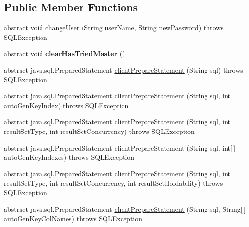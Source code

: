 \subsection*{Public Member Functions}
\begin{DoxyCompactItemize}
\item 
abstract void \mbox{\hyperlink{interfacecom_1_1mysql_1_1jdbc_1_1_connection_a6a6160ecb2c19b5f246450ba9252907d}{change\+User}} (String user\+Name, String new\+Password)  throws S\+Q\+L\+Exception
\item 
\mbox{\label{interfacecom_1_1mysql_1_1jdbc_1_1_connection_aa17ce88810bbbbfaa9b012f4762e7a1b}} 
abstract void {\bfseries clear\+Has\+Tried\+Master} ()
\item 
abstract java.\+sql.\+Prepared\+Statement \mbox{\hyperlink{interfacecom_1_1mysql_1_1jdbc_1_1_connection_a1836d2e9bc2f4f47fb77b2418d08616a}{client\+Prepare\+Statement}} (String sql)  throws S\+Q\+L\+Exception
\item 
abstract java.\+sql.\+Prepared\+Statement \mbox{\hyperlink{interfacecom_1_1mysql_1_1jdbc_1_1_connection_a4942503d586cb18634b960ee276fa1bb}{client\+Prepare\+Statement}} (String sql, int auto\+Gen\+Key\+Index)  throws S\+Q\+L\+Exception
\item 
abstract java.\+sql.\+Prepared\+Statement \mbox{\hyperlink{interfacecom_1_1mysql_1_1jdbc_1_1_connection_a3d058c3722d0afd1cdc4254a9b813c74}{client\+Prepare\+Statement}} (String sql, int result\+Set\+Type, int result\+Set\+Concurrency)  throws S\+Q\+L\+Exception
\item 
abstract java.\+sql.\+Prepared\+Statement \mbox{\hyperlink{interfacecom_1_1mysql_1_1jdbc_1_1_connection_a0a5607f53ef9d376f1ff02fcffd038bf}{client\+Prepare\+Statement}} (String sql, int\mbox{[}$\,$\mbox{]} auto\+Gen\+Key\+Indexes)  throws S\+Q\+L\+Exception
\item 
abstract java.\+sql.\+Prepared\+Statement \mbox{\hyperlink{interfacecom_1_1mysql_1_1jdbc_1_1_connection_af2c3e5b2cd7768c4fdf7ca4e75558bbf}{client\+Prepare\+Statement}} (String sql, int result\+Set\+Type, int result\+Set\+Concurrency, int result\+Set\+Holdability)  throws S\+Q\+L\+Exception
\item 
abstract java.\+sql.\+Prepared\+Statement \mbox{\hyperlink{interfacecom_1_1mysql_1_1jdbc_1_1_connection_a452a8703aca3c45fdafe3e1a5093b8b5}{client\+Prepare\+Statement}} (String sql, String\mbox{[}$\,$\mbox{]} auto\+Gen\+Key\+Col\+Names)  throws S\+Q\+L\+Exception
\item 

\end{DoxyCompactItemize}
